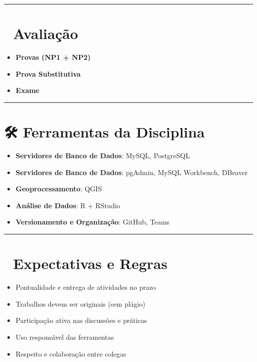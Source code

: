 \documentclass[
]{book}
\providecommand{\tightlist}{%
  \setlength{\itemsep}{0pt}\setlength{\parskip}{0pt}}
\begin{document}
\begin{center}\rule{0.5\linewidth}{0.5pt}\end{center}

\section{📝 Avaliação}\label{avaliauxe7uxe3o}

\begin{itemize}
\tightlist
\item
  \textbf{Provas (NP1 + NP2)}
\item
  \textbf{Prova Substitutiva}
\item
  \textbf{Exame}
\end{itemize}

\begin{center}\rule{0.5\linewidth}{0.5pt}\end{center}

\section{🛠️ Ferramentas da Disciplina}\label{ferramentas-da-disciplina}

\begin{itemize}
\tightlist
\item
  \textbf{Servidores de Banco de Dados}: MySQL, PostgreSQL
\item
  \textbf{Servidores de Banco de Dados}: pgAdmin, MySQL Workbench, DBeaver\\
\item
  \textbf{Geoprocessamento}: QGIS\\
\item
  \textbf{Análise de Dados}: R + RStudio\\
\item
  \textbf{Versionamento e Organização}: GitHub, Teams
\end{itemize}

\begin{center}\rule{0.5\linewidth}{0.5pt}\end{center}

\section{📌 Expectativas e Regras}\label{expectativas-e-regras}

\begin{itemize}
\tightlist
\item
  Pontualidade e entrega de atividades no prazo
\item
  Trabalhos devem ser originais (sem plágio)
\item
  Participação ativa nas discussões e práticas
\item
  Uso responsável das ferramentas
\item
  Respeito e colaboração entre colegas
\end{itemize}
\end{document}
